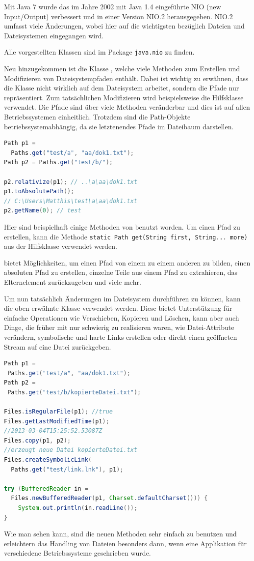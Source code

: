 \documentclass[times, 10pt,twocolumn]{article}
\begin{document}
Mit Java 7 wurde das im Jahre 2002 mit Java 1.4 eingeführte NIO (new Input/Output) verbessert und in einer Version NIO.2
herausgegeben.\cite{v2bJava7} NIO.2 umfasst viele Änderungen, wobei hier auf die wichtigsten bezüglich Dateien und
Dateisystemen eingegangen wird.

Alle vorgestellten Klassen sind im Package \texttt{java.nio} zu finden.

Neu hinzugekommen ist die Klasse , welche viele Methoden zum Erstellen und Modifizieren von Dateisystempfaden enthält. Dabei ist
wichtig zu erwähnen, dass die Klasse nicht wirklich auf dem Dateisystem arbeitet, sondern die Pfade nur repräsentiert. Zum tatsächlichen
Modifizieren wird beispielsweise die Hilfsklasse  verwendet. Die Pfade sind über viele Methoden veränderbar und dies ist auf
allen Betriebssystemen einheitlich. Trotzdem sind die Path-Objekte betriebssystemabhängig, da sie letztenendes Pfade 
im Dateibaum darstellen.
\begin{lstlisting}[language=java,breaklines=true]
Path p1 = 
  Paths.get("test/a", "aa/dok1.txt");
Path p2 = Paths.get("test/b/");

p2.relativize(p1); // ..\a\aa\dok1.txt
p1.toAbsolutePath(); 
// C:\Users\Matthis\test\a\aa\dok1.txt
p2.getName(0); // test
\end{lstlisting}
Hier sind beispielhaft einige Methoden von  benutzt worden. Um einen Pfad zu erstellen, kann die 
Methode \texttt{static Path get(String first, String... more)} aus der Hilfsklasse  verwendet werden.

 bietet Möglichkeiten, um einen Pfad von einem zu einem anderen zu bilden, einen absoluten Pfad zu erstellen,
einzelne Teile aus einem Pfad zu extrahieren, das Elternelement zurückzugeben und viele mehr.

Um nun tatsächlich Änderungen im Dateisystem durchführen zu können, kann die oben erwähnte Klasse  verwendet werden.
Diese bietet Unterstützung für einfache Operationen wie Verschieben, Kopieren und Löschen, kann aber auch Dinge, die früher
mit  nur schwierig zu realisieren waren, wie Datei-Attribute verändern, symbolische und harte Links erstellen oder
direkt einen geöffneten Stream auf eine Datei zurückgeben.\cite{b247nio2}
\begin{lstlisting}[language=java,breaklines=true]
Path p1 = 
 Paths.get("test/a", "aa/dok1.txt");
Path p2 = 
 Paths.get("test/b/kopierteDatei.txt");

Files.isRegularFile(p1); //true
Files.getLastModifiedTime(p1); 
//2013-03-04T15:25:52.53087Z
Files.copy(p1, p2); 
//erzeugt neue Datei kopierteDatei.txt
Files.createSymbolicLink(
  Paths.get("test/link.lnk"), p1);

try (BufferedReader in = 
  Files.newBufferedReader(p1, Charset.defaultCharset())) {
	System.out.println(in.readLine());
}
\end{lstlisting}
Wie man sehen kann, sind die neuen Methoden sehr einfach zu benutzen und erleichtern das Handling von Dateien besonders dann,
wenn eine Applikation für verschiedene Betriebssysteme geschrieben wurde.
\end{document}
